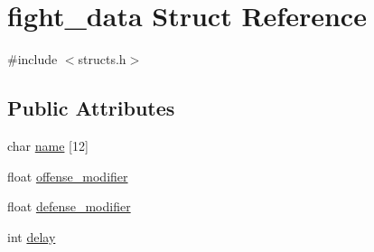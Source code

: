 \hypertarget{structfight__data}{\section{fight\-\_\-data Struct Reference}
\label{structfight__data}
}


{\ttfamily \#include $<$structs.\-h$>$}

\subsection*{Public Attributes}
\begin{DoxyCompactItemize}
\item 
char \hyperlink{structfight__data_a7071040701ede70c5947846c68f5b3a8}{name} \mbox{[}12\mbox{]}
\item 
float \hyperlink{structfight__data_aa869c12593bab69ec208893f05e3bd22}{offense\-\_\-modifier}
\item 
float \hyperlink{structfight__data_adce563612a39d6998338a71465f17b52}{defense\-\_\-modifier}
\item 
int \hyperlink{structfight__data_a666282af0f07ad22d980f4cd441415e5}{delay}
\end{DoxyCompactItemize}



